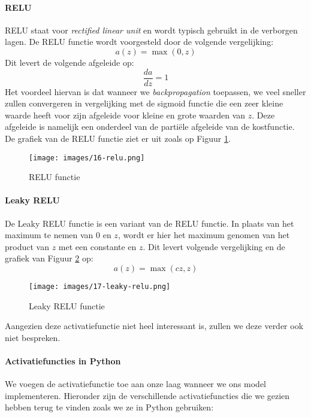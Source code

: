 \paragraph{RELU}

RELU staat voor \textit{rectified linear unit} en wordt typisch gebruikt in de verborgen lagen. De RELU functie wordt voorgesteld door de volgende vergelijking:
\begin{equation}
	a(z) = \max(0, z)
\end{equation}
\noindent
Dit levert de volgende afgeleide op:
\begin{equation}
	\frac{da}{dz} = 1
\end{equation}
\noindent
Het voordeel hiervan is dat wanneer we \textit{backpropagation} toepassen, we veel sneller zullen convergeren in vergelijking met de sigmoid functie die een zeer kleine waarde heeft voor zijn afgeleide voor kleine en grote waarden van $z$. Deze afgeleide is namelijk een onderdeel van de partiële afgeleide van de kostfunctie. \\
\newline
De grafiek van de RELU functie ziet er uit zoals op Figuur \ref{fig:relu}.
\begin{figure}[h]
	\centering
	\texttt{[image: images/16-relu.png]}
	\caption{RELU functie}
	\label{fig:relu}
\end{figure}
\newpage
\paragraph{Leaky RELU}

De Leaky RELU functie is een variant van de RELU functie. In plaats van het maximum te nemen van 0 en $z$, wordt er hier het maximum genomen van het product van $z$ met een constante en $z$. Dit levert volgende vergelijking en de grafiek van Figuur \ref{fig:leaky-relu} op:
\begin{equation}
	a(z) = \max(cz, z)
\end{equation}

\begin{figure}[h]
	\centering
	\texttt{[image: images/17-leaky-relu.png]}
	\caption{Leaky RELU functie}
	\label{fig:leaky-relu}
\end{figure}
\noindent
Aangezien deze activatiefunctie niet heel interessant is, zullen we deze verder ook niet bespreken.

\paragraph{Activatiefuncties in Python}
We voegen de activatiefunctie toe aan onze laag wanneer we ons model implementeren. Hieronder zijn de verschillende activatiefuncties die we gezien hebben terug te vinden zoals we ze in Python gebruiken:

